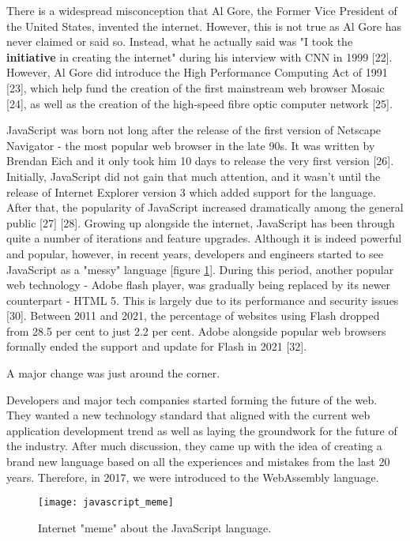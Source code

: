 There is a widespread misconception that Al Gore, the Former Vice President of the United States, invented the internet. However, this is not true as Al Gore has never claimed or said so. Instead, what he actually said was "I took the \textbf{initiative} in creating the internet" during his interview with CNN in 1999 [22]. However, Al Gore did introduce the High Performance Computing Act of 1991 [23], which help fund the creation of the first mainstream web browser Mosaic [24], as well as the creation of the high-speed fibre optic computer network [25].

JavaScript was born not long after the release of the first version of Netscape Navigator - the most popular web browser in the late 90s. It was written by Brendan Eich and it only took him 10 days to release the very first version [26]. Initially, JavaScript did not gain that much attention, and it wasn't until the release of Internet Explorer version 3 which added support for the language. After that, the popularity of JavaScript increased dramatically among the general public [27] [28]. Growing up alongside the internet, JavaScript has been through quite a number of iterations and feature upgrades. Although it is indeed powerful and popular, however, in recent years, developers and engineers started to see JavaScript as a "messy" language [figure \ref{fig:javascript_meme}]. During this period, another popular web technology - Adobe flash player, was gradually being replaced by its newer counterpart - HTML 5. This is largely due to its performance and security issues [30]. Between 2011 and 2021, the percentage of websites using Flash dropped from 28.5 per cent to just 2.2 per cent. Adobe alongside popular web browsers formally ended the support and update for Flash in 2021 [32].

A major change was just around the corner.

Developers and major tech companies started forming the future of the web. They wanted a new technology standard that aligned with the current web application development trend as well as laying the groundwork for the future of the industry. After much discussion, they came up with the idea of creating a brand new language based on all the experiences and mistakes from the last 20 years. Therefore, in 2017, we were introduced to the WebAssembly language.

\newpage
\bigskip
\begin{figure}[hp]
\centering
\texttt{[image: javascript\_meme]}
\caption{\footnotesize{Internet "meme" about the JavaScript language.}}
\captionsetup{aboveskip=0pt,font=it}
\label{fig:javascript_meme}
\end{figure}
\bigskip

